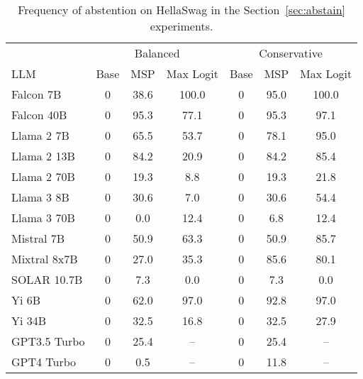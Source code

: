 \begin{table*}[h]
\centering
\caption{Frequency of abstention on HellaSwag in the Section~\ref{sec:abstain} experiments.}
\label{tab:hellaswag_pct_abstained}
\begin{tabular}{lcccccc}
\toprule
& \multicolumn{3}{c}{Balanced} & \multicolumn{3}{c}{Conservative} \\ 
LLM & Base & MSP & Max Logit & Base & MSP & Max Logit \\ 
\cmidrule(lr){1-1}\cmidrule(lr){2-4}\cmidrule(lr){5-7} 
Falcon 7B & 0 & 38.6 & 100.0 & 0 & 95.0 & 100.0\\
Falcon 40B & 0 & 95.3 & 77.1 & 0 & 95.3 & 97.1\\
Llama 2 7B & 0 & 65.5 & 53.7 & 0 & 78.1 & 95.0\\
Llama 2 13B & 0 & 84.2 & 20.9 & 0 & 84.2 & 85.4\\
Llama 2 70B & 0 & 19.3 & 8.8 & 0 & 19.3 & 21.8\\
Llama 3 8B & 0 & 30.6 & 7.0 & 0 & 30.6 & 54.4\\
Llama 3 70B & 0 & 0.0 & 12.4 & 0 & 6.8 & 12.4\\
Mistral 7B & 0 & 50.9 & 63.3 & 0 & 50.9 & 85.7\\
Mixtral 8x7B & 0 & 27.0 & 35.3 & 0 & 85.6 & 80.1\\
SOLAR 10.7B & 0 & 7.3 & 0.0 & 0 & 7.3 & 0.0\\
Yi 6B & 0 & 62.0 & 97.0 & 0 & 92.8 & 97.0\\
Yi 34B & 0 & 32.5 & 16.8 & 0 & 32.5 & 27.9\\
GPT3.5 Turbo & 0 & 25.4 & -- & 0 & 25.4 & --\\
GPT4 Turbo & 0 & 0.5 & -- & 0 & 11.8 & --\\
\bottomrule
\end{tabular}
\end{table*}
